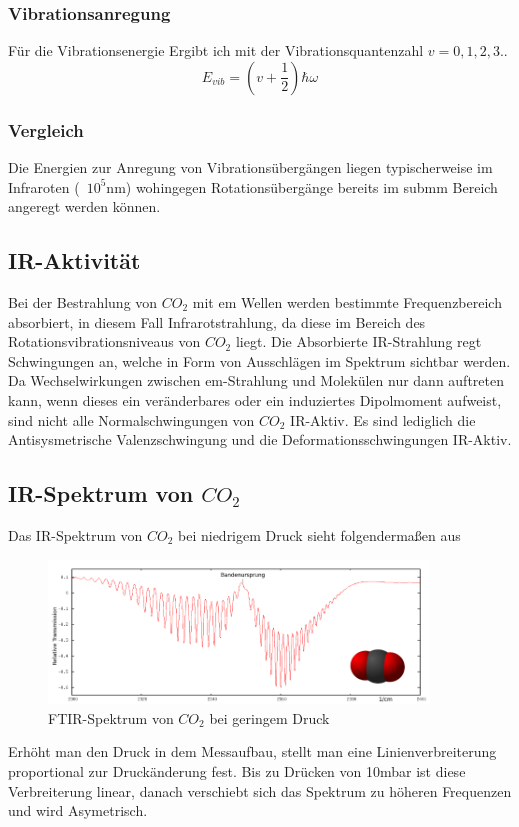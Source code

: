 \documentclass{article}
\begin{document}
        \subsubsection{Vibrationsanregung}
            Für die Vibrationsenergie Ergibt ich mit der Vibrationsquantenzahl $v=0,1,2,3..$
            \begin{equation}
                E_{vib} = (v + \frac{1}{2})\hbar \omega
            \end{equation}
        \subsubsection{Vergleich}
            Die Energien zur Anregung von Vibrationsübergängen liegen typischerweise im Infraroten (~$10^5$nm)
            wohingegen Rotationsübergänge bereits im submm Bereich angeregt werden können.
    
    \subsection{IR-Aktivität}
        Bei der Bestrahlung von $CO_2$ mit em Wellen werden bestimmte  Frequenzbereich absorbiert, in diesem Fall
        Infrarotstrahlung, da diese im Bereich des Rotationsvibrationsniveaus von $CO_2$ liegt. Die Absorbierte IR-Strahlung
        regt Schwingungen an, welche in Form von Ausschlägen im Spektrum sichtbar werden.\\
        Da Wechselwirkungen zwischen em-Strahlung und Molekülen nur dann auftreten kann, wenn dieses ein veränderbares
        oder ein induziertes Dipolmoment aufweist, sind nicht alle Normalschwingungen von $CO_2$ IR-Aktiv.
        Es sind lediglich die Antisysmetrische Valenzschwingung und die Deformationsschwingungen IR-Aktiv.
    
    \subsection{IR-Spektrum von $CO_2$}
        Das IR-Spektrum von $CO_2$ bei niedrigem Druck sieht folgendermaßen aus
        \begin{figure}[H]
            \centering
            \includegraphics[width=0.9\textwidth]{Images/IRSpektrum.PNG}
            \caption{FTIR-Spektrum von $CO_2$ bei geringem Druck}
        \end{figure}
        Erhöht man den Druck in dem Messaufbau, stellt man eine Linienverbreiterung proportional zur
        Druckänderung fest. Bis zu Drücken von 10mbar ist diese Verbreiterung linear, danach verschiebt sich
        das Spektrum zu höheren Frequenzen und wird Asymetrisch.
\end{document}
